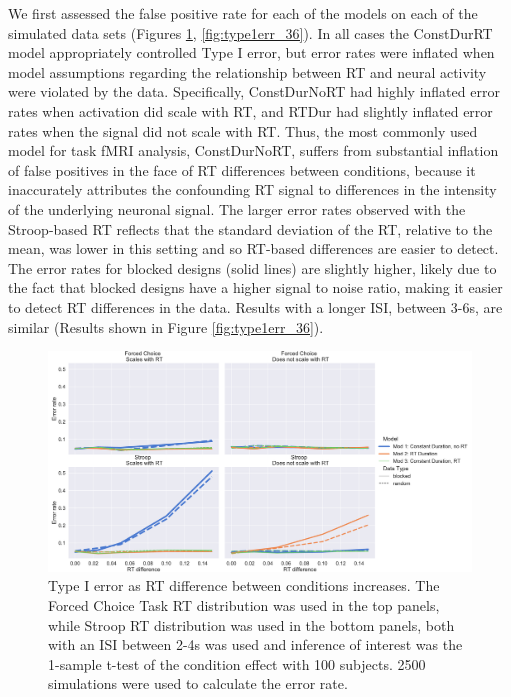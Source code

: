 \documentclass[titlepage,12pt] {article}
\begin{document}
 We first assessed the false positive rate for each of the models on each of the simulated data sets (Figures \ref{fig:type1err_24}, \ref{fig:type1err_36}). In all cases the ConstDurRT model appropriately controlled Type I error, but error rates were inflated when model assumptions regarding the relationship between RT and neural activity were violated by the data.  Specifically, ConstDurNoRT had highly inflated error rates when activation did scale with RT, and RTDur had slightly inflated error rates when the signal did not  scale with RT.  Thus, the most commonly used model for task fMRI analysis, ConstDurNoRT, suffers from substantial inflation of false positives in the face of RT differences between conditions, because it inaccurately attributes the confounding RT signal to differences in the intensity of the underlying neuronal signal.  The larger error rates observed with the Stroop-based RT reflects that the standard deviation of the RT, relative to the mean, was lower in this setting and so RT-based differences are easier to detect. The error rates for blocked designs (solid lines) are slightly higher, likely due to the fact that blocked designs have a higher signal to noise ratio, making it easier to detect RT differences in the data.  Results with a longer ISI, between 3-6s, are similar (Results shown in Figure \ref{fig:type1err_36}).

\begin{figure}
  \centering
   \includegraphics[width=5in]{Figures/type1_err_24.pdf}
   \caption{Type I error as RT difference between conditions increases.  The Forced Choice Task RT distribution was used in the top panels, while Stroop RT distribution was used in the bottom panels, both with an ISI between 2-4s was used and inference of interest was the 1-sample t-test of the condition effect with 100 subjects.  2500 simulations were used to calculate the error rate.}
  \label{fig:type1err_24}
\end{figure}
\end{document}
